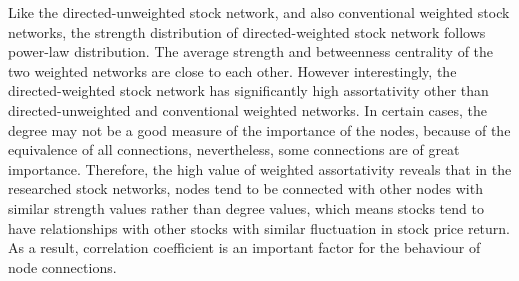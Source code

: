 Like the directed-unweighted stock network, and also conventional weighted stock networks, the strength distribution of directed-weighted stock network follows power-law distribution. The average strength and betweenness centrality of the two weighted networks are close to each other. However interestingly, the directed-weighted stock network has significantly high assortativity other than directed-unweighted and conventional weighted networks. In certain cases, the degree may not be a good measure of the importance of the nodes, because of the equivalence of all connections, nevertheless, some connections are of great importance. Therefore, the high value of weighted assortativity reveals that in the researched stock networks, nodes tend to be connected with other nodes with similar strength values rather than degree values, which means stocks tend to have relationships with other stocks with similar fluctuation in stock price return. As a result, correlation coefficient is an important factor for the behaviour of node connections.

